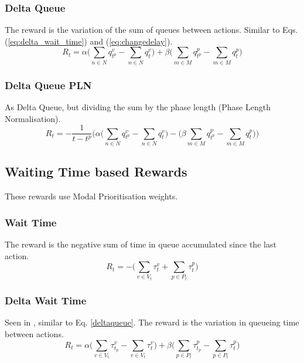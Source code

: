 \documentclass[conference]{IEEEtran}
\begin{document}
\subsubsection{Delta Queue}
The reward is the variation of the sum of queues between actions.
Similar to Eqs. (\ref{eq:delta_wait_time}) and (\ref{eq:changedelay}).
\begin{equation}
    R_t = \alpha \bigg( \sum_{n \in N} q^v_{t^p} -\sum_{n \in N} q^v_{t} \bigg) + \beta \bigg( \sum_{m \in M} q^p_{t^p} - \sum_{m \in M} q^p_{t} \bigg)
    \label{deltaqueue}
\end{equation}

\subsubsection{Delta Queue PLN}
As Delta Queue, but dividing the sum by the phase length (Phase Length Normalisation).
\begin{equation}
    R_t = - \frac{1}{t-t^p} \bigg( \alpha \big( \sum_{n \in N} q^v_{t^p} - \sum_{n \in N} q^v_{t} \big) - 
    \big( \beta \sum_{m \in M} q^p_{t^p}  - \sum_{m \in M} q^p_{t} \big) \bigg)
    \label{queuepln}
\end{equation}

\subsection{Waiting Time based Rewards}
These rewards use Modal Prioritisation weights.
\subsubsection{Wait Time}
The reward is the negative sum of time in queue accumulated since the last action. 
\begin{equation}
R_t = - \bigg( \sum_{v \in V_t} \tau^v_{t} + \sum_{p \in P_t} \tau^p_{t} \bigg)
\label{eq:wait_time}
\end{equation}

\subsubsection{Delta Wait Time}
Seen in \cite{liang2018}, similar to Eq. \ref{deltaqueue}. The reward is the variation in queueing time between actions.
\begin{equation}
R_t = \alpha \bigg( \sum_{v \in V_t} \tau^v_{t_p} -  \sum_{v \in V_t} \tau^v_{t} \bigg) + \beta \bigg( \sum_{p \in P_t} \tau^p_{t_p} -  \sum_{p \in P_t} \tau^p_{t} \bigg)
\label{eq:delta_wait_time}
\end{equation}
\end{document}
